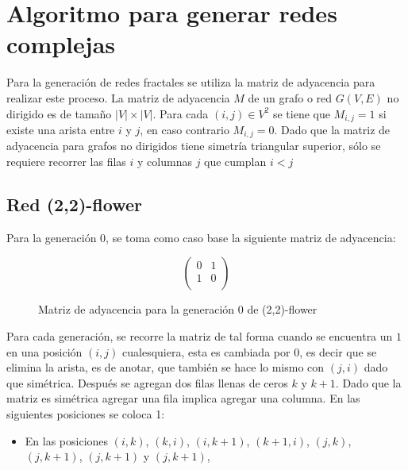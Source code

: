 \section{Algoritmo para generar redes complejas}

Para la generación de redes fractales se utiliza la matriz de adyacencia para realizar este proceso. La matriz de adyacencia $M$ de un grafo o red $G(V,E)$ no dirigido es de tamaño $|V|\times|V|$. Para cada $(i,j)\in V^2$ se tiene que $M_{i,j}=1$ si existe una arista entre $i$ y $j$, en caso contrario $M_{i,j}=0$. 
Dado que la matriz de adyacencia para grafos no dirigidos tiene simetría triangular superior, sólo se requiere recorrer las filas $i$ y columnas $j$ que cumplan $i<j$

\subsection{Red (2,2)-flower}

Para la generación 0, se toma como caso base la siguiente matriz de adyacencia:

\begin{figure}[H]
    \centering
\[ 
\left( \begin{array}{cc}
 0 & 1  \\ 
 1 & 0 \\
\end{array} \right)\]
\caption{Matriz de adyacencia para la generación 0 de (2,2)-flower}
\end{figure}

Para cada generación, se recorre la matriz de tal forma cuando se encuentra un $1$ en una posición $(i,j)$ cualesquiera, esta es cambiada por 0, es decir que se elimina la arista, es de anotar, que también se hace lo mismo con $(j,i)$ dado que simétrica.  Después se agregan dos filas llenas de ceros $k$ y $k+1$. Dado que la matriz es simétrica agregar una fila implica agregar una columna. En las siguientes posiciones se coloca 1:

\begin{itemize}
    \item En las posiciones $(i,k)$, $(k,i)$, $(i,k+1)$, $(k+1,i)$, $(j,k)$, $(j,k+1)$, $(j,k+1)$ y $(j,k+1)$,
\end{itemize}

